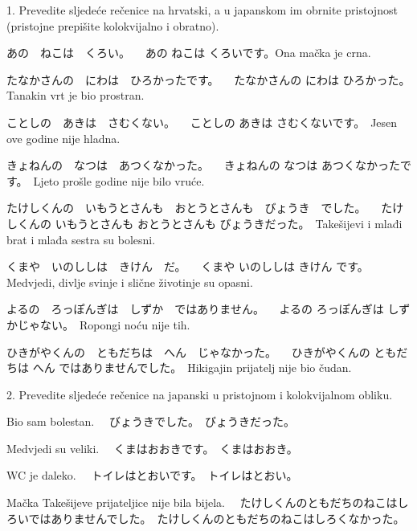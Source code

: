 
\author{Katja Kržišnik}

	
	\begin{mondai}{1. Prevedite sljedeće rečenice na hrvatski, a u japanskom im obrnite pristojnost (pristojne prepišite kolokvijalno i obratno).}
		\item あの　ねこは　くろい。 \newline　あの ねこは くろいです。Ona mačka je crna.　
		\item たなかさんの　にわは　ひろかったです。 \newline　たなかさんの にわは ひろかった。　Tanakin vrt je bio prostran.　
		\item ことしの　あきは　さむくない。 \newline　ことしの あきは さむくないです。　Jesen ove godine nije hladna.
		\item きょねんの　なつは　あつくなかった。 \newline　きょねんの なつは あつくなかったです。　Ljeto prošle godine nije bilo vruće.　
		\item たけしくんの　いもうとさんも　おとうとさんも　びょうき　でした。 \newline　たけしくんの いもうとさんも おとうとさんも びょうきだった。　Takešijevi i mlađi brat i mlađa sestra su bolesni.
		\item くまや　いのししは　きけん　だ。 \newline　くまや いのししは きけん です。　Medvjedi, divlje svinje i slične životinje su opasni.
		\item よるの　ろっぽんぎは　しずか　ではありません。 \newline　よるの ろっぽんぎは しずかじゃない。　Ropongi noću nije tih. 
		\item ひきがやくんの　ともだちは　へん　じゃなかった。 \newline　ひきがやくんの ともだちは へん ではありませんでした。　Hikigajin prijatelj nije bio čudan.
	\end{mondai}
	
	\begin{mondai}{2. Prevedite sljedeće rečenice na japanski u pristojnom i kolokvijalnom obliku.}
		\item Bio sam bolestan. \newline　びょうきでした。　びょうきだった。
		\item Medvjedi su veliki. \newline　くまはおおきです。　くまはおおき。
		\item WC je daleko. \newline　トイレはとおいです。　トイレはとおい。
		\item Mačka Takešijeve prijateljice nije bila bijela. \newline　たけしくんのともだちのねこはしろいではありませんでした。　たけしくんのともだちのねこはしろくなかった。
	\end{mondai}
